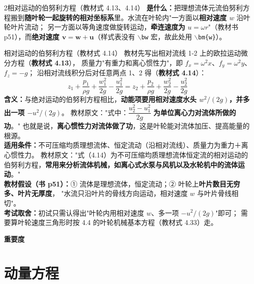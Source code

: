 \begin{kaodian}{2}{相对运动的伯努利方程（教材式 4.13、4.14）}
\textbf{是什么：}把理想流体元流伯努利方程搬到\textbf{随叶轮一起旋转的相对坐标系}里。水流在叶轮内"一方面以\textbf{相对速度 $w$} 沿叶轮叶片流动；
另一方面以等角速度做旋转运动，\textbf{牵连速度为 $u=\omega r$}"（教材书 p51），而\textbf{绝对速度 $\bm{v}=\bm{w}+\bm{u}$}（样式表没有 $\backslash$\texttt{bw} 宏，故此处用 $\backslash$\texttt{bm\{w\}}）。

\begin{gongshi}{相对运动的伯努利方程（教材式 4.14）}
教材先写出相对流线 1-2 上的欧拉运动微分方程（\textbf{教材式 4.13}），
质量力"有重力和离心惯性力"，即 $f_x=\omega^2x$、$f_y=\omega^2y$、$f_z=-g$；
沿相对流线积分后对任意两点 1、2 得（\textbf{教材式 4.14}）：
\[ z_1+\frac{p_1}{\rho g}+\frac{w_1^2}{2g}-\frac{u_1^2}{2g}
   =z_2+\frac{p_2}{\rho g}+\frac{w_2^2}{2g}-\frac{u_2^2}{2g} \]
\textbf{含义：}与绝对运动的伯努利方程相比，\textbf{动能项要用相对速度水头 $w^2/(2g)$，并多出一项 $-u^2/(2g)$}。
教材原文："式中：$\dfrac{u_2^2-u_1^2}{2g}$ \textbf{为单位离心力对流体所做的功}。"
也就是说，\textbf{离心惯性力对流体做了功}，这是叶轮能对流体加压、提高能量的根源。\\
\textbf{适用条件：}不可压缩均质理想流体、恒定流动（沿相对流线）、质量力为重力＋离心惯性力。
教材原文："式（4.14）为不可压缩均质理想流体恒定流的相对运动的伯努利方程，\textbf{常用来分析流体机械，如离心式水泵与风机以及水轮机中的流体运动}。"\\
\textbf{教材假设（书 p51）：}① 流体是理想流体，恒定流动；② 叶轮上\textbf{叶片数目无穷多、叶片无厚度}，
"水流只沿叶片的骨线方向运动，相对速度 $w$ 与叶片骨线相切"。\\
\textbf{考试取舍：}初试只需认得出"叶轮内用相对速度 $w$、多一项 $-u^2/(2g)$"即可；
需要算叶轮速度三角形时按 4.4 的叶轮机械基本方程（教材式 4.33）走。
\end{gongshi}
\textbf{重要度 }\quad{}\quad{}
\end{kaodian}

\section{动量方程}

